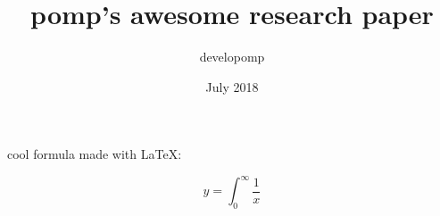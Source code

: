 \documentclass[11pt, a4paper]{article}
\title{pomp's awesome research paper}
\author{developomp}
\date{July 2018}
\begin{document}
\maketitle

\newpage

cool formula made with \LaTeX:

$$
    y = \int_{0}^{\infty} \frac{1}{x}
$$
\end{document}
